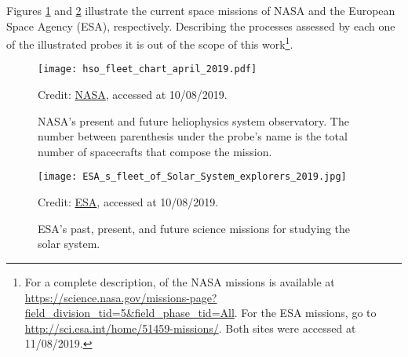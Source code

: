 \documentclass[12pt,a4paper,ruledheader]{report}
\begin{document}
\begin{appendix}
Figures
\ref{nasa} and \ref{esa} illustrate the current space missions of NASA and the
European Space Agency (ESA), respectively. Describing the processes assessed by
each one of the illustrated probes it is out of the scope of this work\footnote{
  For a complete description, of the NASA missions is available at
\url{https://science.nasa.gov/missions-page?field_division_tid=5&field_phase_tid=All}.
For the ESA missions, go to \url{http://sci.esa.int/home/51459-missions/}.
  Both sites were accessed at 11/08/2019.}.
\begin{figure}[h]
  \begin{center}
    \texttt{[image: hso\_fleet\_chart\_april\_2019.pdf]}
    \caption{NASA's present and future heliophysics system observatory. The number
      between parenthesis under the probe's name is the total number of spacecrafts
      that compose the mission.}
      {\footnotesize Credit:}
      \href{https://science.nasa.gov/heliophysics}
      {\footnotesize NASA}{\footnotesize , accessed at 10/08/2019.}
    \label{nasa}
  \end{center}
\end{figure}
\begin{figure}[h]
  \begin{center}
    \texttt{[image: ESA\_s\_fleet\_of\_Solar\_System\_explorers\_2019.jpg]}
    \caption{ESA's past, present, and future science missions for studying the solar system.}
      {\footnotesize Credit:}
      \href{https://www.esa.int/spaceinimages/Images/2019/02/ESA_s_fleet_of_Solar_System_explorers}
      {\footnotesize ESA}{\footnotesize , accessed at 10/08/2019.}
    \label{esa}
  \end{center}
\end{figure}

















\end{appendix}
\end{document}

